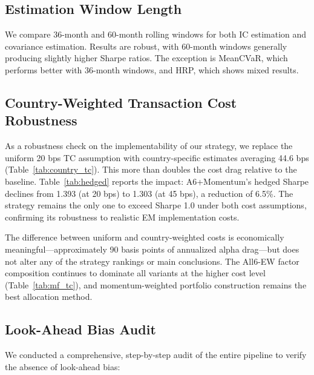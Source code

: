 \documentclass[12pt,a4paper]{article}
\begin{document}
\subsection{Estimation Window Length}

We compare 36-month and 60-month rolling windows for both IC estimation and covariance estimation. Results are robust, with 60-month windows generally producing slightly higher Sharpe ratios. The exception is MeanCVaR, which performs better with 36-month windows, and HRP, which shows mixed results.

\subsection{Country-Weighted Transaction Cost Robustness}

As a robustness check on the implementability of our strategy, we replace the uniform 20 bps TC assumption with country-specific estimates averaging 44.6 bps (Table~\ref{tab:country_tc}). This more than doubles the cost drag relative to the baseline. Table~\ref{tab:hedged} reports the impact: A6+Momentum's hedged Sharpe declines from 1.393 (at 20 bps) to 1.303 (at 45 bps), a reduction of 6.5\%. The strategy remains the only one to exceed Sharpe 1.0 under both cost assumptions, confirming its robustness to realistic EM implementation costs.

The difference between uniform and country-weighted costs is economically meaningful---approximately 90 basis points of annualized alpha drag---but does not alter any of the strategy rankings or main conclusions. The All6-EW factor composition continues to dominate all variants at the higher cost level (Table~\ref{tab:mf_tc}), and momentum-weighted portfolio construction remains the best allocation method.

\subsection{Look-Ahead Bias Audit}

We conducted a comprehensive, step-by-step audit of the entire pipeline to verify the absence of look-ahead bias:
\end{document}
